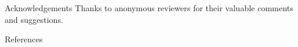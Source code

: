 \documentclass{beamer}
\newcommand{\graphbox}[8]{
  \begin{scope}[xshift=#2,yshift=#3]
    \draw [rounded corners=2mm] (0,0) rectangle (#4,-#5);
    \node at (0,0mm) [anchor=north west,inner sep=1mm] {#1};
    \begin{scope}[xshift=#4/2+#6,yshift=#7] 
    #8
    \end{scope}
  \end{scope}
}
\begin{document}




\begin{frame}{Acknowledgements}
    Thanks to anonymous reviewers for their valuable comments and suggestions.
\end{frame}

\begin{frame}[allowframebreaks]{References}
    \printbibliography[heading=none]
\end{frame}
\end{document}
